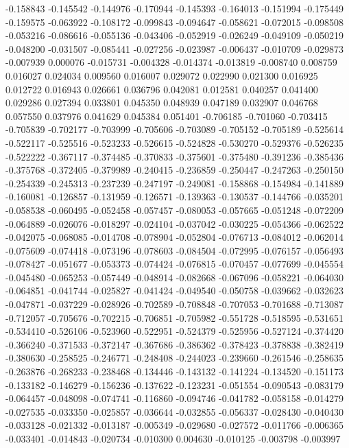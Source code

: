 -0.158843
-0.145542
-0.144976
-0.170944
-0.145393
-0.164013
-0.151994
-0.175449
-0.159575
-0.063922
-0.108172
-0.099843
-0.094647
-0.058621
-0.072015
-0.098508
-0.053216
-0.086616
-0.055136
-0.043406
-0.052919
-0.026249
-0.049109
-0.050219
-0.048200
-0.031507
-0.085441
-0.027256
-0.023987
-0.006437
-0.010709
-0.029873
-0.007939
0.000076
-0.015731
-0.004328
-0.014374
-0.013819
-0.008740
0.008759
0.016027
0.024034
0.009560
0.016007
0.029072
0.022990
0.021300
0.016925
0.012722
0.016943
0.026661
0.036796
0.042081
0.012581
0.040257
0.041400
0.029286
0.027394
0.033801
0.045350
0.048939
0.047189
0.032907
0.046768
0.057550
0.037976
0.041629
0.045384
0.051401
-0.706185
-0.701060
-0.703415
-0.705839
-0.702177
-0.703999
-0.705606
-0.703089
-0.705152
-0.705189
-0.525614
-0.522117
-0.525516
-0.523233
-0.526615
-0.524828
-0.530270
-0.529376
-0.526235
-0.522222
-0.367117
-0.374485
-0.370833
-0.375601
-0.375480
-0.391236
-0.385436
-0.375768
-0.372405
-0.379989
-0.240415
-0.236859
-0.250447
-0.247263
-0.250150
-0.254339
-0.245313
-0.237239
-0.247197
-0.249081
-0.158868
-0.154984
-0.141889
-0.160081
-0.126857
-0.131959
-0.126571
-0.139363
-0.130537
-0.144766
-0.035201
-0.058538
-0.060495
-0.052458
-0.057457
-0.080053
-0.057665
-0.051248
-0.072209
-0.064889
-0.026076
-0.018297
-0.024104
-0.037042
-0.030225
-0.054366
-0.062522
-0.042075
-0.068085
-0.014708
-0.078904
-0.052804
-0.076713
-0.084012
-0.062014
-0.075609
-0.074418
-0.073196
-0.078603
-0.084504
-0.072995
-0.076157
-0.056493
-0.078427
-0.051677
-0.053373
-0.074424
-0.076815
-0.070457
-0.077699
-0.045554
-0.045480
-0.065253
-0.057449
-0.048914
-0.082668
-0.067096
-0.058221
-0.064030
-0.064851
-0.041744
-0.025827
-0.041424
-0.049540
-0.050758
-0.039662
-0.032623
-0.047871
-0.037229
-0.028926
-0.702589
-0.708848
-0.707053
-0.701688
-0.713087
-0.712057
-0.705676
-0.702215
-0.706851
-0.705982
-0.551728
-0.518595
-0.531651
-0.534410
-0.526106
-0.523960
-0.522951
-0.524379
-0.525956
-0.527124
-0.374420
-0.366240
-0.371533
-0.372147
-0.367686
-0.386362
-0.378423
-0.378838
-0.382419
-0.380630
-0.258525
-0.246771
-0.248408
-0.244023
-0.239660
-0.261546
-0.258635
-0.263876
-0.268233
-0.238468
-0.134446
-0.143132
-0.141224
-0.134520
-0.151173
-0.133182
-0.146279
-0.156236
-0.137622
-0.123231
-0.051554
-0.090543
-0.083179
-0.064457
-0.048098
-0.074741
-0.116860
-0.094746
-0.041782
-0.058158
-0.014279
-0.027535
-0.033350
-0.025857
-0.036644
-0.032855
-0.056337
-0.028430
-0.040430
-0.033128
-0.021332
-0.013187
-0.005349
-0.029680
-0.027572
-0.011766
-0.006365
-0.033401
-0.014843
-0.020734
-0.010300
0.004630
-0.010125
-0.003798
-0.003997
